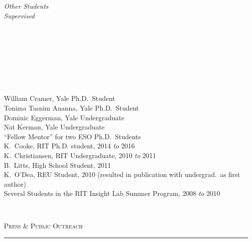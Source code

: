 \documentclass[11pt]{article}
\makeatletter
\def\vhrulefill#1{\leavevmode\leaders\hrule\@height#1\hfill \kern\z@}
\makeatother
\begin{document}
\hspace{2.5mm} \parbox{1.5in}{\textit{Other Students \\ Supervised \\\\\\\\\\\\\\\\}} \parbox{5.15in}{
William Cramer, Yale Ph.D.~Student\\
Tonima Tasnim Ananna, Yale Ph.D.~Student\\
Dominic Eggerman, Yale Undergraduate \\
Nat Kerman, Yale Undergraduate\\
``Fellow Mentor'' for two ESO Ph.D.~Students \\
K.~Cooke, RIT Ph.D. student, 2014 \textit{to} 2016 \\
K.~Christiansen, RIT Undergraduate, 2010 \textit{to} 2011 \\ B.~Litts, High School Student, 2011 \\ K.~O'Dea, REU Student, 2010 (resulted in publication with undergrad.~as first author)  \\  Several Students in the RIT Insight Lab Summer Program, 2008 \textit{to} 2010}\\


\vspace{4mm}


\textsc{Press \& Public Outreach} \vhrulefill{0.4pt}
\end{document}
